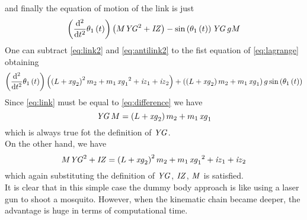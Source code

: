 \normalsize
%
and finally the equation of motion of the link is just
%
\begin{equation}
    \label{eq:link}
    \left( {\frac {{\rm d}^{2}}{{\rm d}{t}^{2}}}\theta_{1} \left( t
    \right)  \right)  \left( M{{\it YG}}^{2}+{\it IZ} \right) -\sin
    \left( \theta_{1} \left( t \right)  \right) {\it YG}\,gM
\end{equation}
%
One can subtract \ref{eq:link2} and \ref{eq:antilink2} to the fist equation of \ref{eq:lagrange} obtaining
%
\begin{equation}
    \label{eq:difference}
    \left( {\frac {{\rm d}^{2}}{{\rm d}{t}^{2}}}\theta_{1} \left( t
    \right)  \right)  \left(  \left( L+{\it xg}_{2} \right) ^{2}m_{2}+m_{
   1}\,{{\it xg}_{1}}^{2}+{\it iz}_{1}+{\it iz}_{2} \right) + \left( 
    \left( L+{\it xg}_{2} \right) m_{2}+m_{1}\,{\it xg}_{1} \right) g\sin
    \left( \theta_{1} \left( t \right)  \right)   
\end{equation}
%
Since \ref{eq:link} must be equal to \ref{eq:difference} we have 
%
\begin{equation}
    {\it YG}\,M = \left( L+{\it xg}_{2} \right) m_{2}+m_{1}\,{\it xg}_{1} 
\end{equation}
%
which is always true fot the definition of $\it YG$.\\
On the other hand, we have 
%
\begin{equation}
    M{{\it YG}}^{2}+{\it IZ} = \left( L+{\it xg}_{2} \right) ^{2}m_{2}+m_{1}\,{{\it xg}_{1}}^{2}+{\it iz}_{1}+{\it iz}_{2}
\end{equation}
%
which again substituting the definition of $\it YG$, $\it IZ$, $\it M$ is satisfied.\\
It is clear that in this simple case the dummy body approach is like using a laser gun to shoot a mosquito. However, when the kinematic chain became deeper, the advantage is huge in terms of computational time.
% 